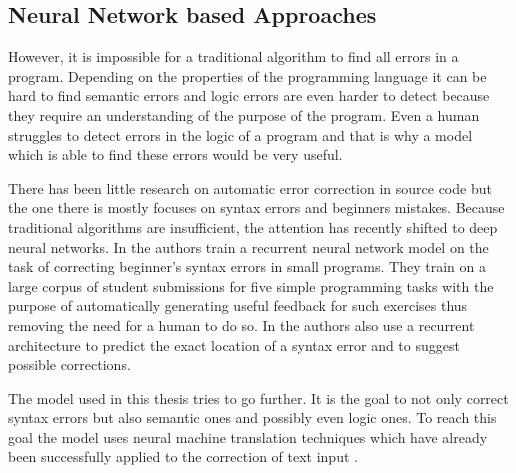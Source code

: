 \subsection{Neural Network based Approaches}

However, it is impossible for a traditional algorithm to find all errors in a program. Depending on the properties of the programming language it can be hard to find semantic errors and logic errors are even harder to detect because they require an understanding of the purpose of the program. Even a human struggles to detect errors in the logic of a program and that is why a model which is able to find these errors would be very useful.

There has been little research on automatic error correction in source code but the one there is mostly focuses on syntax errors and beginners mistakes. Because traditional algorithms are insufficient, the attention has recently shifted to deep neural networks. In \cite{programming_assignments_correction} the authors train a recurrent neural network model on the task of correcting beginner's syntax errors in small programs. They train on a large corpus of student submissions for five simple programming tasks with the purpose of automatically generating useful feedback for such exercises thus removing the need for a human to do so. In \cite{rnn_syntax_correction} the authors also use a recurrent architecture to predict the exact location of a syntax error and to suggest possible corrections.

The model used in this thesis tries to go further. It is the goal to not only correct syntax errors but also semantic ones and possibly even logic ones. To reach this goal the model uses neural machine translation techniques which have already been successfully applied to the correction of text input \cite{seq2seq_on_text_correction}.
